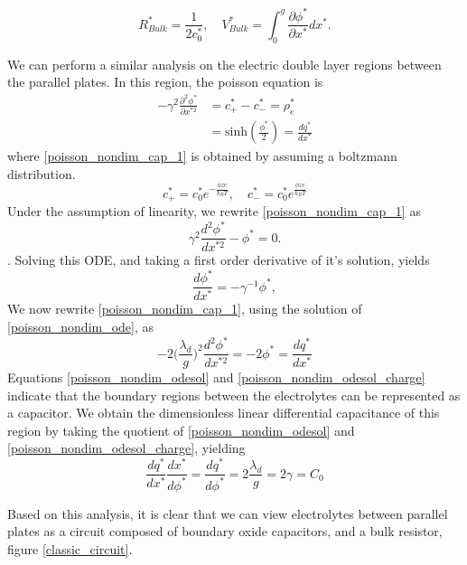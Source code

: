 \begin{equation} \label{bulk_resist_volt}
    R_{Bulk}^* = \frac{1}{2c_0^*}, \quad V_{Bulk}^* = \int_{0}^{g} \frac{\partial \phi^*}{\partial x^*} dx^*.
\end{equation}

We can perform a similar analysis on the electric double layer regions between the parallel plates. In this region, the poisson equation is 
\begin{align}
    -\gamma^2 \frac{\partial^2 \phi^*}{\partial x^{*2}} & = c_+^* - c_-^* = \rho_e^* \label{poisson_nondim_cap_1} \\
    &  = \text{sinh}(\frac{\phi^*}{2}) = \frac{dq^*}{dx^*}\nonumber
\end{align}
where \ref{poisson_nondim_cap_1} is obtained by assuming a boltzmann distribution.
\begin{equation} \label{boltzmann_distrib}
    c_+^* = c_0^* e^{-\frac{\phi z e}{k_B T}}, \quad c_-^* = c_0^* e^{\frac{\phi z e}{k_B T}}
\end{equation}
 Under the assumption of linearity, we rewrite \ref{poisson_nondim_cap_1} as  
\begin{equation}\label{poisson_nondim_ode}
\gamma^2 \frac{d^2\phi^*}{dx^{*2}} - \phi^* =0.
\end{equation}.
Solving this ODE, and taking a first order derivative of it's solution, yields
\begin{equation} \label{poisson_nondim_odesol}
\frac{d\phi^*}{dx^*} = -\gamma^{-1} \phi^*,
\end{equation}
We now rewrite \ref{poisson_nondim_cap_1}, using the solution of \ref{poisson_nondim_ode}, as
\begin{equation} \label{poisson_nondim_odesol_charge}
-2 \bigg(\frac{\lambda_d}{g}\bigg)^2 \frac{d^2\phi^*}{dx^{*2}} = -2 \phi^* = \frac{dq^*}{dx^*}
\end{equation}
Equations \ref{poisson_nondim_odesol} and \ref{poisson_nondim_odesol_charge} indicate that the boundary regions between the electrolytes can be represented as a capacitor. We obtain the dimensionless linear differential capacitance of this region by taking the quotient of \ref{poisson_nondim_odesol} and \ref{poisson_nondim_odesol_charge}, yielding
\begin{equation} \label{lin_diff_cap}
\frac{dq^*}{dx^*}\frac{dx^*}{d\phi^*} = \frac{dq^*}{d\phi^*} = 2\frac{\lambda_d}{g} = 2\gamma = C_0 
\end{equation}

Based on this analysis, it is clear that we can view electrolytes between parallel plates as a circuit composed of boundary oxide capacitors, and a bulk resistor, figure \ref{classic_circuit}.

